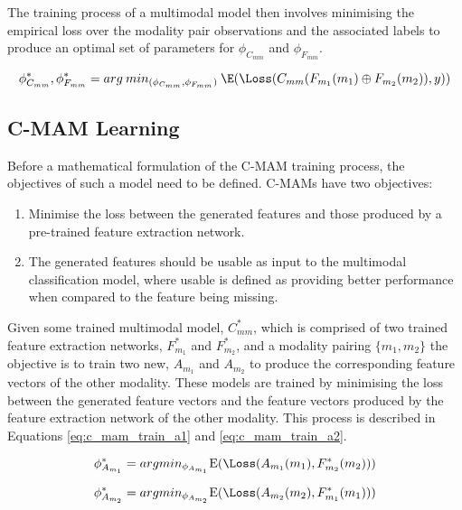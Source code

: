 The training process of a multimodal model then involves minimising the empirical loss over the modality pair observations and the associated labels to produce an optimal set of parameters for $\phi_{C_{mm}}$ and $\phi_{F_{mm}}$. 

\begin{equation} \label{eq:mm_training}
    \phi_{C_{mm}}^*, \phi_{F_{mm}}^* = arg\:min_{(\phi_{C_{mm}}, \phi_{F_{mm}})} \: \E (\Loss(C_{mm}(F_{m_1}(m_1) \oplus F_{m_2}(m_2)), y))
\end{equation}

\subsection{C-MAM Learning}
Before a mathematical formulation of the C-MAM training process, the objectives of such a model need to be defined. C-MAMs have two objectives:
\begin{enumerate}
    \item Minimise the loss between the generated features and those produced by a pre-trained feature extraction network.
    \item The generated features should be usable as input to the multimodal classification model, where usable is defined as providing better performance when compared to the feature being missing.
\end{enumerate}

Given some trained multimodal model, $C_{mm}^*$, which is comprised of two trained feature extraction networks, $F_{m_1}^*$ and $F_{m_2}^*$, and a modality pairing $\{m_1, m_2\}$ the objective is to train two new, $A_{m_1}$ and $A_{m_2}$ to produce the corresponding feature vectors of the other modality. These models are trained by minimising the loss between the generated feature vectors and the feature vectors produced by the feature extraction network of the other modality. This process is described in Equations \ref{eq:c_mam_train_a1} and \ref{eq:c_mam_train_a2}.

\begin{equation} \label{eq:c_mam_train_a1}
    \phi_{A_{m_1}}^* = arg min_{\tiny \phi_{A_{m_1}}} \mathrm{E} (\Loss  (A_{m_1}(m_1), F_{m_2}^*(m_2)))
\end{equation}

\begin{equation}\label{eq:c_mam_train_a2}
    \phi_{A_{m_2}}^* = arg min_{\tiny \phi_{A_{m_2}}} \mathrm{E} (\Loss  (A_{m_2}(m_2), F_{m_1}^*(m_1)))
\end{equation}